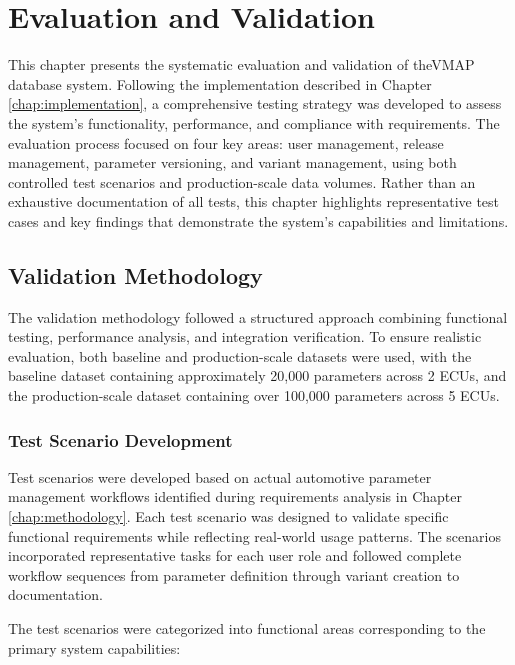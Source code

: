 \chapter{Evaluation and Validation}
\label{chap:evaluation}

This chapter presents the systematic evaluation and validation of the\ac{VMAP} database system. Following the implementation described in Chapter \ref{chap:implementation}, a comprehensive testing strategy was developed to assess the system's functionality, performance, and compliance with requirements. The evaluation process focused on four key areas: user management, release management, parameter versioning, and variant management, using both controlled test scenarios and production-scale data volumes. Rather than an exhaustive documentation of all tests, this chapter highlights representative test cases and key findings that demonstrate the system's capabilities and limitations.

\section{Validation Methodology}
\label{sec:validation-methodology}

The validation methodology followed a structured approach combining functional testing, performance analysis, and integration verification. To ensure realistic evaluation, both baseline and production-scale datasets were used, with the baseline dataset containing approximately 20,000 parameters across 2 \acp{ECU}, and the production-scale dataset containing over 100,000 parameters across 5 \acp{ECU}.

\subsection{Test Scenario Development}
\label{subsec:test-scenario-development}

Test scenarios were developed based on actual automotive parameter management workflows identified during requirements analysis in Chapter \ref{chap:methodology}. Each test scenario was designed to validate specific functional requirements while reflecting real-world usage patterns. The scenarios incorporated representative tasks for each user role and followed complete workflow sequences from parameter definition through variant creation to documentation.

The test scenarios were categorized into functional areas corresponding to the primary system capabilities:

